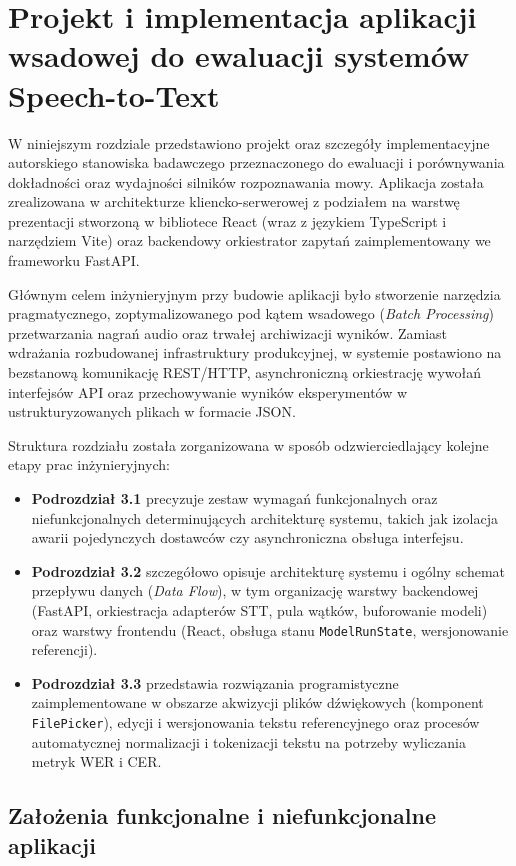 
\section{Projekt i implementacja aplikacji wsadowej do ewaluacji systemów Speech-to-Text}
\label{ch:implementation}
W niniejszym rozdziale przedstawiono projekt oraz szczegóły implementacyjne autorskiego stanowiska badawczego przeznaczonego do ewaluacji i porównywania dokładności oraz wydajności silników rozpoznawania mowy. Aplikacja została zrealizowana w architekturze kliencko-serwerowej z podziałem na warstwę prezentacji stworzoną w bibliotece React (wraz z językiem TypeScript i narzędziem Vite) oraz backendowy orkiestrator zapytań zaimplementowany we frameworku FastAPI.

Głównym celem inżynieryjnym przy budowie aplikacji było stworzenie narzędzia pragmatycznego, zoptymalizowanego pod kątem wsadowego (\textit{Batch Processing}) przetwarzania nagrań audio oraz trwałej archiwizacji wyników. Zamiast wdrażania rozbudowanej infrastruktury produkcyjnej, w systemie postawiono na bezstanową komunikację REST/HTTP, asynchroniczną orkiestrację wywołań interfejsów API oraz przechowywanie wyników eksperymentów w ustrukturyzowanych plikach w formacie JSON.

Struktura rozdziału została zorganizowana w sposób odzwierciedlający kolejne etapy prac inżynieryjnych:
\begin{itemize}
    \item \textbf{Podrozdział 3.1} precyzuje zestaw wymagań funkcjonalnych oraz niefunkcjonalnych determinujących architekturę systemu, takich jak izolacja awarii pojedynczych dostawców czy asynchroniczna obsługa interfejsu.
    \item \textbf{Podrozdział 3.2} szczegółowo opisuje architekturę systemu i ogólny schemat przepływu danych (\textit{Data Flow}), w tym organizację warstwy backendowej (FastAPI, orkiestracja adapterów STT, pula wątków, buforowanie modeli) oraz warstwy frontendu (React, obsługa stanu \texttt{ModelRunState}, wersjonowanie referencji).
    \item \textbf{Podrozdział 3.3} przedstawia rozwiązania programistyczne zaimplementowane w obszarze akwizycji plików dźwiękowych (komponent \texttt{FilePicker}), edycji i wersjonowania tekstu referencyjnego oraz procesów automatycznej normalizacji i tokenizacji tekstu na potrzeby wyliczania metryk WER i CER.
\end{itemize}

\subsection{Założenia funkcjonalne i niefunkcjonalne aplikacji}
\label{subsec:requirements}


